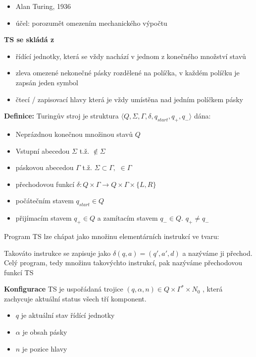 \documentclass[10pt,a4paper]{article}
\begin{document}
		
		\begin{itemize}
			\item Alan Turing, 1936
			\item účel: porozumět omezením mechanického výpočtu
		\end{itemize}		
		\textbf{TS se skládá z}
		\begin{itemize}
			\item řídící jednotky, která se vždy nachází v jednom z konečného množství stavů
			\item zleva omezené nekonečné pásky rozdělené na políčka, v každém políčku je zapsán jeden symbol
			\item čtecí / zapisovací hlavy která je vždy umístěna nad jedním políčkem pásky
		\end{itemize}
		\textbf{Definice: }
		Turingův stroj je struktura $\langle Q, \Sigma, \Gamma, \delta, q_{start}, q_{+}, q_{-} \rangle $ dána:
		\begin{itemize}
			\item Neprázdnou konečnou množinou stavů $Q$
			\item Vstupní abecedou  $\Sigma$ t.ž. \textvisiblespace $ \notin \Sigma$
			\item páskovou abecedou $\Gamma$ t.ž. $\Sigma \subset \Gamma,$ \textvisiblespace $\in  \Gamma $
			\item přechodovou funkcí $\delta : Q \times  \Gamma \rightarrow Q \times \Gamma \times \{L , R \} $
			\item počátečním stavem $q_{start} \in Q$
			\item přijímacím stavem $q_{+} \in Q $ a zamítacím stavem $q_{-} \in Q.$ $q_{+} \neq q_{-}$
		\end{itemize}
		Program TS lze chápat jako množinu elementárních instrukcí ve tvaru: 

		\textit{}

		Takováto instrukce se zapisuje jako $\delta (q,a) = (q', a', d)$ a nazýváme ji přechod. Celý program, tedy množinu 				takovýchto instrukcí, pak nazýváme přechodovou funkcí TS

		\textbf{Konfigurace} TS je uspořádaná trojice $(q, \alpha, n) \in Q \times \Gamma^{*} \times N_{0}$ , která zachycuje
		aktuální status všech tří komponent. 
		\begin{itemize}
			\item $q$ je aktuální stav řídící jednotky
			\item $\alpha$ je obsah pásky
			\item $n$ je pozice hlavy
		\end{itemize}
\end{document}
